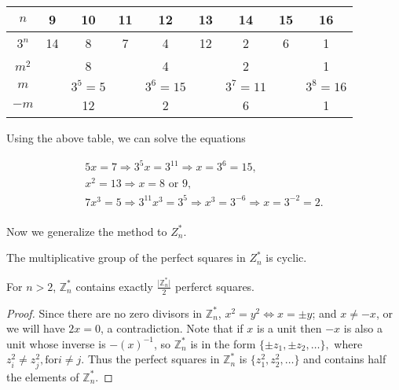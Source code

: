 \documentclass{article}
\begin{document}
\begin{table}[h]
\begin{tabular}{|c|c|c|c|c|c|c|c|c|}
\hline
$n$   & 9  & 10      & 11 & 12       & 13 & 14       & 15 & 16       \\ \hline
$3^n$ & 14 & 8       & 7  & 4        & 12 & 2        & 6  & 1        \\ \hline
$m^2$ &    & 8       &    & 4        &    & 2        &    & 1        \\ \hline
$m$   &    & $3^5=5$ &    & $3^6=15$ &    & $3^7=11$ &    & $3^8=16$ \\ \hline
$-m$  &    & 12      &    & 2        &    & 6        &    & 1        \\ \hline
\end{tabular}
\end{table}
\def\lc{\left\lceil}   
\def\rc{\right\rceil}

\begin{example}
Using the above table, we can solve the equations
\end{example}


\begin{gather}
5x=7 \Rightarrow 3^5x=3^{11} \Rightarrow x=3^6=15,  \\
x^2=13 \Rightarrow x = 8 \text{ or } 9, \\ 
7x^3=5 \Rightarrow 3^{11}x^3=3^5 \Rightarrow x^3 = 3^{-6} \Rightarrow x = 3^{-2} = 2. \\
\end{gather}

Now we generalize the method to $Z^*_n.$
\begin{theorem}
The multiplicative group of the perfect squares in $Z^*_n$ is cyclic.
\end{theorem} 

\begin{theorem}
For $n>2$, $\mathbb{Z}^*_n$ contains exactly $\frac{\vert \mathbb{Z}^*_n \vert}{2}$ perferct squares.
\end{theorem}
\begin{proof}
Since there are no zero divisors in $\mathbb{Z}^*_n$, $x^2 = y^2 \Leftrightarrow x=\pm y$; and $x \not =-x$, or we will have $2x = 0$, a contradiction. Note that if $x$ is a unit then $-x$ is also a unit whose inverse is $-(x)^{-1}$, so $\mathbb{Z}^*_n$ is in the form $\{ \pm z_1, \pm z_2,\ldots \},$ where $z_i^2 \not = z_j^2, \text{for} i \not = j$. Thus the perfect squares in $\mathbb{Z}^*_n$ is $\{z_1^2, z_2^2, \ldots\}$ and contains half the elements of $\mathbb{Z}^*_n.$
\end{proof}
\end{document}
